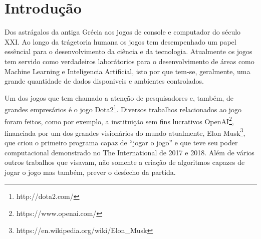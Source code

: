 \documentclass[
12pt,				%
openright,			%
oneside,			%
a4paper,			%
english,			%
brazil,				%
]{abntex2}
\begin{document}

\imprimirfolhaderosto

\tableofcontents*
\cleardoublepage


\textual

\chapter{Introdução}
\label{cha:introducao}


Dos astrágalos da antiga Grécia aos jogos de console e computador do século XXI.
Ao longo da trágetoria humana os jogos tem desempenhado um papel essêncial para
o desenvolvimento da ciência e da tecnologia. Atualmente os jogos tem servido
como verdadeiros laborátorios para o desenvolvimento de áreas como Machine
Learning e Inteligencia Artificial, isto por que tem-se, geralmente, uma grande
quantidade de dados disponiveis e ambientes controlados. \cite{silva2017moba}

Um dos jogos que tem chamado a atenção de pesquisadores e, também, de
grandes empresários é o jogo Dota2\footnote{http://dota2.com/}. Diversos
trabalhos relacionados ao jogo foram feitos, como por exemplo, a instituição sem
fins lucrativos OpenAI\footnote{https://www.openai.com/}, financiada por um dos
grandes visionários do mundo atualmente,  Elon
Musk\footnote{https://en.wikipedia.org/wiki/Elon\_Musk}, que criou o primeiro programa capaz de
``jogar o jogo'' e que teve seu poder computacional demonstrado no The International de 2017 e 2018.
Além de vários outros trabalhos que visavam, não somente a criação de algoritmos capazes de jogar o
jogo mas também, prever o desfecho da partida.
\end{document}

